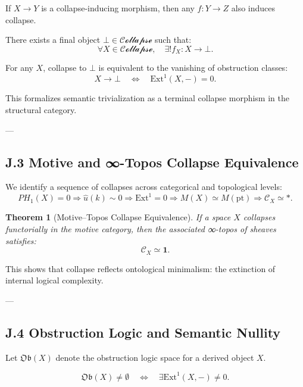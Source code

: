 \documentclass[11pt]{article}
\newtheorem{theorem}{Theorem}[section]
\begin{document}
\begin{axiom}
If $X \rightarrow Y$ is a collapse-inducing morphism, then any $f: Y \rightarrow Z$ also induces collapse.

\begin{axiom}
There exists a final object $\bot \in \mathcal{Collapse}$ such that:
\[
\forall X \in \mathcal{Collapse},\quad \exists! f_X: X \rightarrow \bot.
\]

\begin{axiom}
For any $X$, collapse to $\bot$ is equivalent to the vanishing of obstruction classes:
\[
X \rightarrow \bot \quad \Longleftrightarrow \quad \mathrm{Ext}^1(X, -) = 0.
\]
\end{axiom}

This formalizes semantic trivialization as a terminal collapse morphism in the structural category.

---

\subsection*{J.3 Motive and ∞-Topos Collapse Equivalence}

We identify a sequence of collapses across categorical and topological levels:
\[
PH_1(X) = 0 \Rightarrow \widehat{u}(k) \sim 0 \Rightarrow \mathrm{Ext}^1 = 0 \Rightarrow M(X) \simeq M(\mathrm{pt}) \Rightarrow \mathcal{C}_X \simeq \ast.
\]

\begin{theorem}[Motive–Topos Collapse Equivalence]
If a space $X$ collapses functorially in the motive category,  
then the associated ∞-topos of sheaves satisfies:
\[
\mathcal{C}_X \simeq \mathbf{1}.
\]
\end{theorem}

This shows that collapse reflects ontological minimalism: the extinction of internal logical complexity.

---

\subsection*{J.4 Obstruction Logic and Semantic Nullity}

Let $\mathfrak{Ob}(X)$ denote the obstruction logic space for a derived object $X$.

\[
\mathfrak{Ob}(X) \neq \emptyset \quad \Longleftrightarrow \quad \exists \mathrm{Ext}^1(X, -) \neq 0.
\]


\end{axiom}
\end{axiom}
\end{document}
